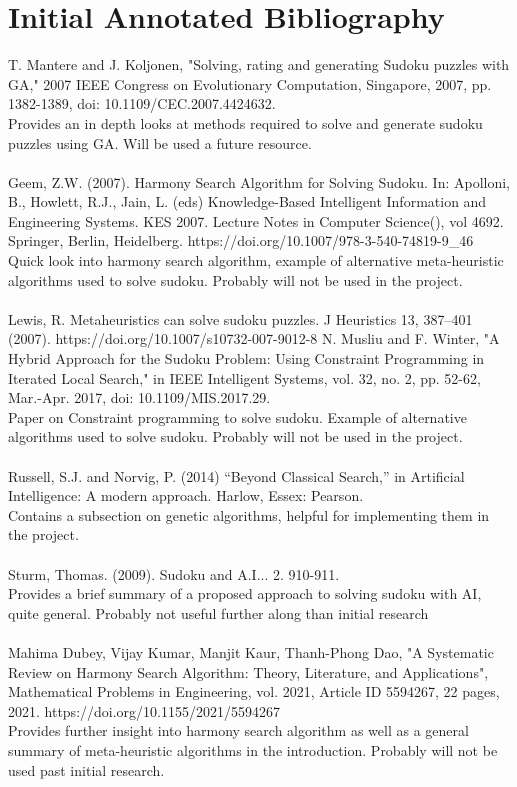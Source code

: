 \documentclass[a4paper,10pt]{article}
\begin{document}
\section*{Initial Annotated Bibliography}
T. Mantere and J. Koljonen, "Solving, rating and generating Sudoku puzzles with GA," 2007 IEEE Congress on Evolutionary Computation, Singapore, 2007, pp. 1382-1389, doi: 10.1109/CEC.2007.4424632. \\Provides an in depth looks at methods required to solve and generate sudoku puzzles using GA. Will be used a future resource.  \\ \\
Geem, Z.W. (2007). Harmony Search Algorithm for Solving Sudoku. In: Apolloni, B., Howlett, R.J., Jain, L. (eds) Knowledge-Based Intelligent Information and Engineering Systems. KES 2007. Lecture Notes in Computer Science(), vol 4692. Springer, Berlin, Heidelberg. https://doi.org/10.1007/978-3-540-74819-9\_46  \\Quick look into harmony search algorithm, example of alternative meta-heuristic algorithms used to solve sudoku. Probably will not be used in the project. \\ \\
Lewis, R. Metaheuristics can solve sudoku puzzles. J Heuristics 13, 387–401 (2007). https://doi.org/10.1007/s10732-007-9012-8
N. Musliu and F. Winter, "A Hybrid Approach for the Sudoku Problem: Using Constraint Programming in Iterated Local Search," in IEEE Intelligent Systems, vol. 32, no. 2, pp. 52-62, Mar.-Apr. 2017, doi: 10.1109/MIS.2017.29. \\Paper on Constraint programming to solve sudoku. Example of alternative algorithms used to solve sudoku. Probably will not be used in the project. \\ \\
Russell, S.J. and Norvig, P. (2014) “Beyond Classical Search,” in Artificial Intelligence: A modern approach. Harlow, Essex: Pearson. \\ Contains a subsection on genetic algorithms, helpful for implementing them in the project. \\ \\
Sturm, Thomas. (2009). Sudoku and A.I... 2. 910-911. \\ Provides a brief summary of a proposed approach to solving sudoku with AI, quite general. Probably not useful further along than initial research \\ \\
Mahima Dubey, Vijay Kumar, Manjit Kaur, Thanh-Phong Dao, "A Systematic Review on Harmony Search Algorithm: Theory, Literature, and Applications", Mathematical Problems in Engineering, vol. 2021, Article ID 5594267, 22 pages, 2021. https://doi.org/10.1155/2021/5594267 \\ Provides further insight into harmony search algorithm as well as a general summary of meta-heuristic algorithms in the introduction. Probably will not be used past initial research. 
\end{document}
